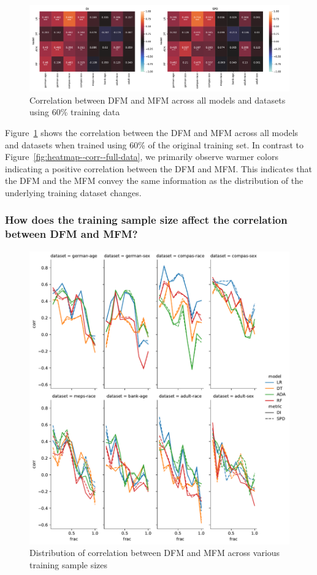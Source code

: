 \documentclass{article}
\begin{document}
\begin{figure}
  \centering
  \includegraphics[width=0.95\linewidth]{heatmap--corr--training-sets-frac.pdf}
  \caption{Correlation between DFM and MFM across all models and
    datasets using 60\% training data}
  \label{fig:heatmap--corr--training-sets-frac}
\end{figure}

Figure \ref{fig:heatmap--corr--training-sets-frac} shows the
correlation between the DFM and MFM across all models and datasets
when trained using 60\% of the original training set. In contrast to
Figure \ref{fig:heatmap--corr--full-data}, we primarily observe warmer
colors indicating a positive correlation between the DFM and MFM. This
indicates that the DFM and the MFM convey the same information as the
distribution of the underlying training dataset changes.

\subsubsection{How does the training sample size affect the correlation between DFM and MFM?}\label{sec:results-corr-frac}

\begin{figure}
  \centering
  \includegraphics[width=0.95\linewidth]{lineplot--frac--corr.pdf}
  \caption{Distribution of correlation between DFM and MFM across
    various training sample sizes}
  \label{fig:lineplot--frac--corr}
\end{figure}
\end{document}
